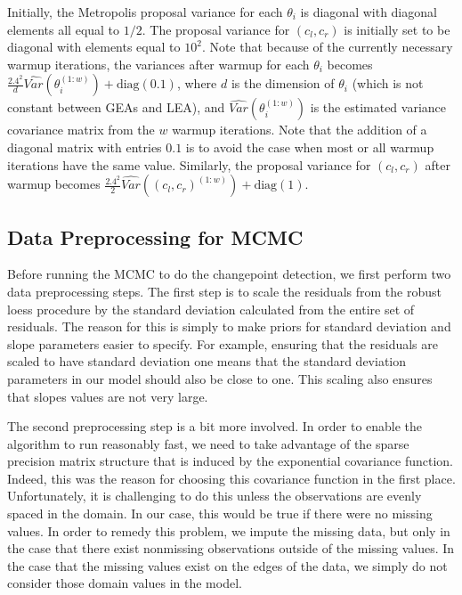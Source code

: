 \documentclass[12pt]{article}
\begin{document}
Initially, the Metropolis proposal variance for each \(\theta_i\) is
diagonal with diagonal elements all equal to \(1/2\). The proposal
variance for \((c_l, c_r)\) is initially set to be diagonal with
elements equal to \(10^2\). Note that because of the currently necessary
warmup iterations, the variances after warmup for each \(\theta_i\)
becomes
\(\frac{2.4^2}{d}\hat{Var}(\theta_i^{(1:w)}) + \text{diag}(0.1)\), where
\(d\) is the dimension of \(\theta_i\) (which is not constant between
GEAs and LEA), and \(\hat{Var}(\theta_i^{(1:w)})\) is the estimated
variance covariance matrix from the \(w\) warmup iterations. Note that
the addition of a diagonal matrix with entries \(0.1\) is to avoid the
case when most or all warmup iterations have the same value. Similarly,
the proposal variance for \((c_l, c_r)\) after warmup becomes
\(\frac{2.4^2}{2}\hat{Var}((c_l,c_r)^{(1:w)}) + \text{diag}(1)\).

\subsection{Data Preprocessing for MCMC}

Before running the MCMC to do the changepoint detection, we first
perform two data preprocessing steps. The first step is to scale the
residuals from the robust loess procedure by the standard deviation
calculated from the entire set of residuals. The reason for this is
simply to make priors for standard deviation and slope parameters easier
to specify. For example, ensuring that the residuals are scaled to have
standard deviation one means that the standard deviation parameters in
our model should also be close to one. This scaling also ensures that
slopes values are not very large.

The second preprocessing step is a bit more involved. In order to enable
the algorithm to run reasonably fast, we need to take advantage of the
sparse precision matrix structure that is induced by the exponential
covariance function. Indeed, this was the reason for choosing this
covariance function in the first place. Unfortunately, it is challenging
to do this unless the observations are evenly spaced in the domain. In
our case, this would be true if there were no missing values. In order
to remedy this problem, we impute the missing data, but only in the case
that there exist nonmissing observations outside of the missing values.
In the case that the missing values exist on the edges of the data, we
simply do not consider those domain values in the model.
\end{document}
